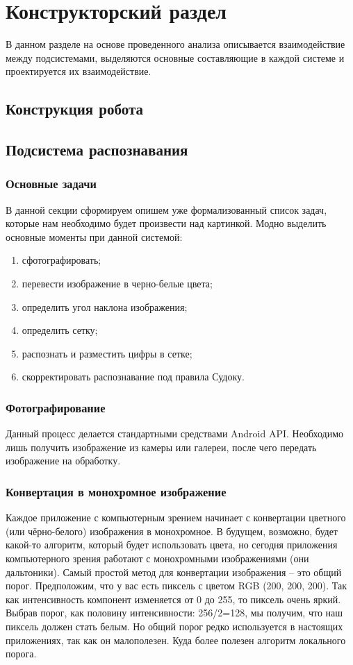 \chapter{Конструкторский раздел}
\label{cha:design}

В данном разделе на основе проведенного анализа описывается взаимодействие между подсистемами, выделяются основные составляющие в каждой системе и проектируется их взаимодействие.

\section{Конструкция робота}


\section{Подсистема распознавания}
\subsection{Основные задачи}
В данной секции сформируем опишем уже формализованный список задач, которые нам необходимо будет произвести над картинкой.
Модно выделить основные моменты при данной системой:
\begin{enumerate}
  \item сфотографировать;
  \item перевести изображение в черно-белые цвета;
  \item определить угол наклона изображения;
  \item определить сетку;
  \item распознать и разместить цифры в сетке;
  \item скорректировать распознавание под правила Судоку.
\end{enumerate}

\subsection{Фотографирование}
Данный процесс делается стандартными средствами Android API. Необходимо лишь получить изображение из камеры или галереи, после чего передать изображение на обработку.

\subsection{Конвертация в монохромное изображение}
Каждое приложение с компьютерным зрением начинает с конвертации цветного (или чёрно-белого) изображения в монохромное. В будущем, возможно, будет какой-то алгоритм, который будет использовать цвета, но сегодня приложения компьютерного зрения работают с монохромными изображениями (они дальтоники).
Самый простой метод для конвертации изображения – это общий порог. Предположим, что у вас есть пиксель с цветом RGB (200, 200, 200). Так как интенсивность компонент изменяется от 0 до 255, то пиксель очень яркий. Выбрав порог, как половину интенсивности: 256/2=128, мы получим, что наш пиксель должен стать белым. Но общий порог редко используется в настоящих приложениях, так как он малополезен. Куда более полезен алгоритм локального порога.

